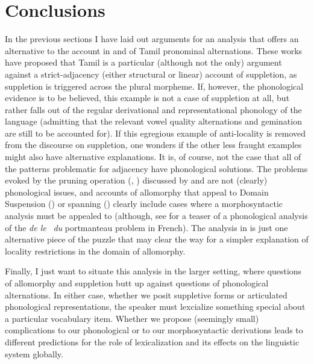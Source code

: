 \documentclass[output=paper]{langscibook}
\begin{document}
\section{Conclusions}\label{sec:newell:4}

In the previous sections I have laid out arguments for an analysis that offers an alternative to the account in \citet{Moskal2015} and \citet{moskal2016towards} of Tamil pronominal alternations. These works have proposed that Tamil is a particular (although not the only) argument against a strict-adjacency (either structural or linear) account of suppletion, as suppletion is triggered across the plural morpheme. If, however, the phonological evidence is to be believed, this example is not a case of suppletion at all, but rather falls out of the regular derivational and representational phonology of the language (admitting that the relevant vowel quality alternations and gemination are still to be accounted for). If this egregious example of anti-locality is removed from the discourse on suppletion, one wonders if the other less fraught examples might also have alternative explanations. It is, of course, not the case that all of the patterns problematic for adjacency have phonological solutions. The  problems evoked by the pruning operation (\citealt{Embick2003}, \citeyear{embick2010localism}) discussed by \citet{Moskal2015} and \citet{moskal2016towards} are not (clearly) phonological issues, and accounts of allomorphy that appeal to Domain Suspension (\citealt{bobaljik2012universals,BobaljikWurmbrand2013}) or spanning (\citealt{Merchant2015,svenonius2016spans}) clearly include cases where a morphosyntactic analysis must be appealed to (although, see \citealt{newell2018re} for a teaser of a phonological analysis of the\textit{ de le} \rightarrow\ \textit{du} portmanteau problem in French). The analysis in  is just one alternative piece of the puzzle that may clear the way for a simpler explanation of locality restrictions in the domain of allomorphy.

Finally, I just want to situate this analysis in the larger setting, where questions of allomorphy and suppletion butt up against questions of phonological alternations. In either case, whether we posit suppletive forms or articulated phonological representations, the speaker must lexcialize something special about a particular vocabulary item. Whether we propose (seemingly small) complications to our phonological or to our morphosyntactic derivations leads to different predictions for the role of lexicalization and its effects on the linguistic system globally.
\end{document}
